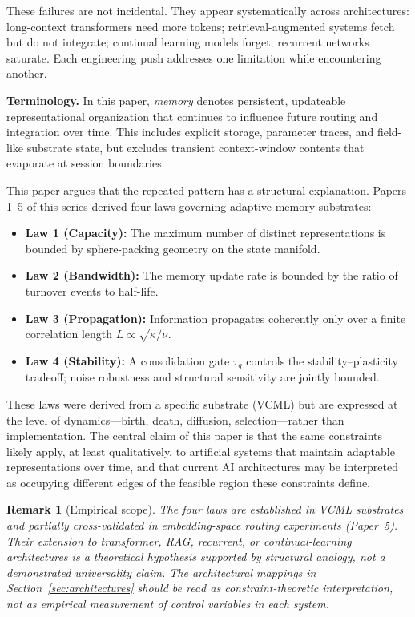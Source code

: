 \documentclass[12pt]{article}
\newtheorem{remark}{Remark}
\begin{document}
These failures are not incidental. They appear systematically across architectures: long-context transformers need more tokens; retrieval-augmented systems fetch but do not integrate; continual learning models forget; recurrent networks saturate. Each engineering push addresses one limitation while encountering another.

\textbf{Terminology.} In this paper, \emph{memory} denotes persistent, updateable representational organization that continues to influence future routing and integration over time. This includes explicit storage, parameter traces, and field-like substrate state, but excludes transient context-window contents that evaporate at session boundaries.

This paper argues that the repeated pattern has a structural explanation. Papers 1--5 of this series \cite{aubin2026capacity,aubin2026bandwidth,aubin2026propagation,aubin2026stability,aubin2026unified} derived four laws governing adaptive memory substrates:
\begin{itemize}
  \item \textbf{Law 1 (Capacity):} The maximum number of distinct representations is bounded by sphere-packing geometry on the state manifold.
  \item \textbf{Law 2 (Bandwidth):} The memory update rate is bounded by the ratio of turnover events to half-life.
  \item \textbf{Law 3 (Propagation):} Information propagates coherently only over a finite correlation length $L \propto \sqrt{\kappa/\nu}$.
  \item \textbf{Law 4 (Stability):} A consolidation gate $\tau_g$ controls the stability--plasticity tradeoff; noise robustness and structural sensitivity are jointly bounded.
\end{itemize}

These laws were derived from a specific substrate (VCML) but are expressed at the level of dynamics---birth, death, diffusion, selection---rather than implementation. The central claim of this paper is that the same constraints likely apply, at least qualitatively, to artificial systems that maintain adaptable representations over time, and that current AI architectures may be interpreted as occupying different edges of the feasible region these constraints define.

\begin{remark}[Empirical scope]
The four laws are established in VCML substrates and partially cross-validated in embedding-space routing experiments (Paper~5). Their extension to transformer, RAG, recurrent, or continual-learning architectures is a theoretical hypothesis supported by structural analogy, not a demonstrated universality claim. The architectural mappings in Section~\ref{sec:architectures} should be read as constraint-theoretic interpretation, not as empirical measurement of control variables in each system.
\end{remark}
\end{document}
